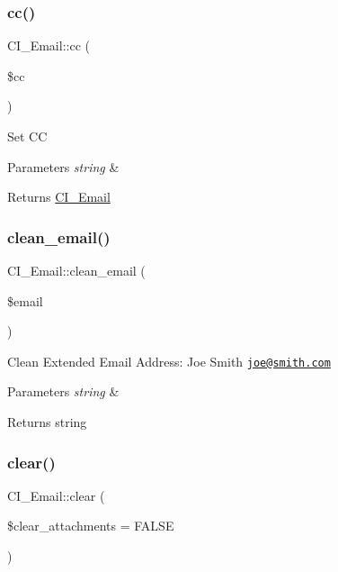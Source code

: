 \subsubsection{\texorpdfstring{cc()}{cc()}}
{\footnotesize\ttfamily C\+I\+\_\+\+Email\+::cc (\begin{DoxyParamCaption}\item[{}]{\$cc }\end{DoxyParamCaption})}

Set CC


\begin{DoxyParams}{Parameters}
{\em string} & \\
\hline
\end{DoxyParams}
\begin{DoxyReturn}{Returns}
\mbox{\hyperlink{class_c_i___email}{C\+I\+\_\+\+Email}} 
\end{DoxyReturn}
\mbox{\label{class_c_i___email_adbb20aca93d51d34e229f08708e08f40}} 
\subsubsection{\texorpdfstring{clean\+\_\+email()}{clean\_email()}}
{\footnotesize\ttfamily C\+I\+\_\+\+Email\+::clean\+\_\+email (\begin{DoxyParamCaption}\item[{}]{\$email }\end{DoxyParamCaption})}

Clean Extended Email Address\+: Joe Smith \href{mailto:joe@smith.com}{\tt joe@smith.\+com}


\begin{DoxyParams}{Parameters}
{\em string} & \\
\hline
\end{DoxyParams}
\begin{DoxyReturn}{Returns}
string 
\end{DoxyReturn}
\mbox{\label{class_c_i___email_a7c0f66ed81021608123984c93cec8df5}} 
\subsubsection{\texorpdfstring{clear()}{clear()}}
{\footnotesize\ttfamily C\+I\+\_\+\+Email\+::clear (\begin{DoxyParamCaption}\item[{}]{\$clear\+\_\+attachments = {\ttfamily FALSE} }\end{DoxyParamCaption})}

